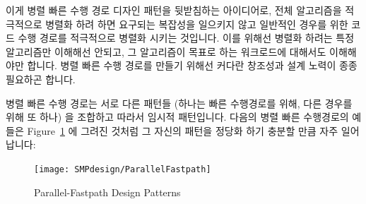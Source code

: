 이게 병렬 빠른 수행 경로 디자인 패턴을 뒷받침하는 아이디어로, 전체 알고리즘을
적극적으로 병렬화 하려 하면 요구되는 복잡성을 일으키지 않고 일반적인 경우를
위한 코드 수행 경로를 적극적으로 병렬화 시키는 것입니다.
이를 위해선 병렬화 하려는 특정 알고리즘만 이해해선 안되고, 그 알고리즘이 목표로
하는 워크로드에 대해서도 이해해야만 합니다.
병렬 빠른 수행 경로를 만들기 위해선 커다란 창조성과 설계 노력이 종종 필요하곤
합니다.

병렬 빠른 수행 경로는 서로 다른 패턴들 (하나는 빠른 수행경로를 위해, 다른
경우를 위해 또 하나) 을 조합하고 따라서 임시적 패턴입니다.
다음의 병렬 빠른 수행경로의 예들은
Figure~\ref{fig:SMPdesign:Parallel-Fastpath Design Patterns} 에 그려진 것처럼
그 자신의 패턴을 정당화 하기 충분할 만큼 자주 일어납니다:

\begin{figure}[tbp]
\centering
\texttt{[image: SMPdesign/ParallelFastpath]}
\caption{Parallel-Fastpath Design Patterns}
\label{fig:SMPdesign:Parallel-Fastpath Design Patterns}
\end{figure}

